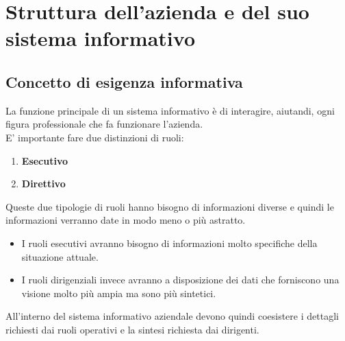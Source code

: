 \documentclass{book}
\begin{document}
    \chapter{Struttura dell'azienda e del suo sistema informativo}
    \section{Concetto di esigenza informativa}
    La funzione principale di un sistema informativo è di interagire, aiutandi, ogni figura professionale che fa funzionare l'azienda.\\
    E' importante fare due distinzioni di ruoli:
    \begin{enumerate}
        \item \textbf{Esecutivo}
        \item \textbf{Direttivo}
    \end{enumerate}
    Queste due tipologie di ruoli hanno bisogno di informazioni diverse e quindi le informazioni verranno date in modo meno o più astratto.
    \begin{itemize}
        \item I ruoli esecutivi avranno bisogno di informazioni molto specifiche della situazione attuale.
        \item I ruoli dirigenziali invece avranno a disposizione dei dati che forniscono una visione molto più ampia ma sono più sintetici.
    \end{itemize}
    All'interno del sistema informativo aziendale devono quindi coesistere i dettagli richiesti dai ruoli operativi e la sintesi richiesta dai dirigenti.
\end{document}
